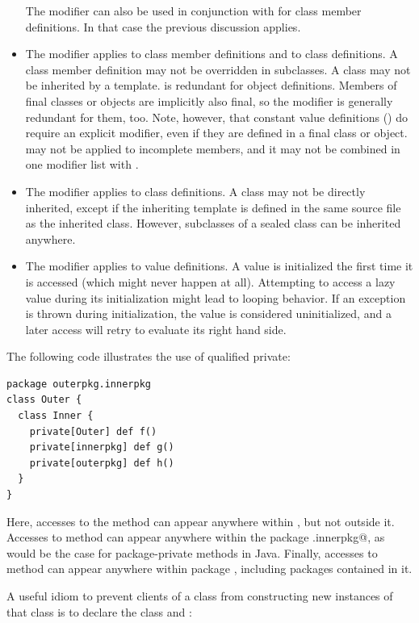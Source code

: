 \begin{itemize}
The  modifier can also be used in conjunction with
 for class member definitions. In that case the
previous discussion applies.
\item
The  modifier applies to class member definitions and to
class definitions. A  class member definition may not be
overridden in subclasses. A  class may not be inherited by
a template.  is redundant for object definitions.  Members
of final classes or objects are implicitly also final, so the
 modifier is generally redundant for them, too. Note, however, that
constant value definitions () do require an explicit  modifier,
even if they are defined in a final class or object.
 may
not be applied to incomplete members, and it may not be combined in one
modifier list with .
\item
The  modifier applies to class definitions. A
 class may not be directly inherited, except if the inheriting 
template is defined in the same source file as the inherited class.
However, subclasses of a sealed class can be inherited anywhere.
\item
The  modifier applies to value definitions. A 
value is initialized the first time it is accessed (which might never
happen at all). Attempting to access a lazy value during its
initialization might lead to looping behavior. If an exception is
thrown during initialization, the value is considered uninitialized,
and a later access will retry to evaluate its right hand side.
\end{itemize}

\example The following code illustrates the use of qualified private:
\begin{lstlisting}
package outerpkg.innerpkg
class Outer {
  class Inner {
    private[Outer] def f()
    private[innerpkg] def g()
    private[outerpkg] def h()
  }
}
\end{lstlisting}
Here, accesses to the method \lstinline@f@ can appear anywhere within
\lstinline@OuterClass@, but not outside it. Accesses to method
\lstinline@g@ can appear anywhere within the package
\lstinline@outerpkg.innerpkg@, as would be the case for
package-private methods in Java. Finally, accesses to method
\lstinline@h@ can appear anywhere within package \lstinline@outerpkg@,
including packages contained in it. 

\example A useful idiom to prevent clients of a class from
constructing new instances of that class is to declare the class
 and :

